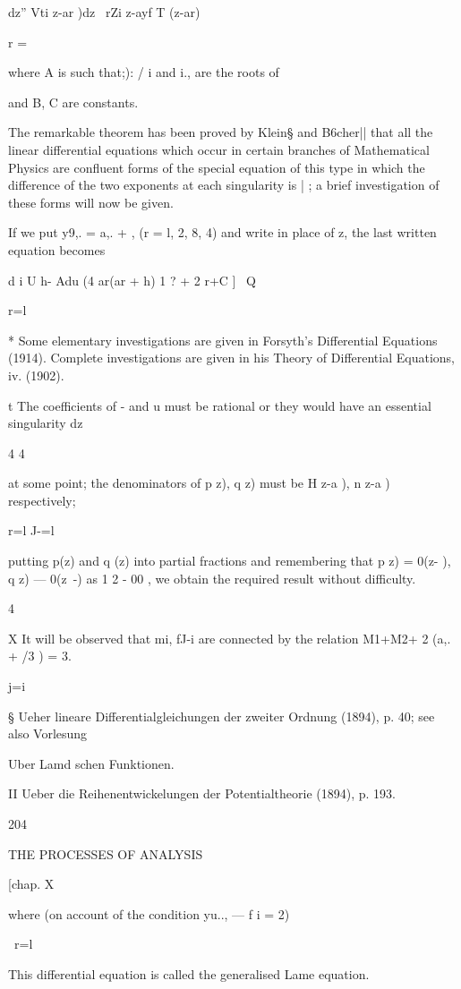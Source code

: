 dz'' Vti z-ar )dz \ rZi z-ayf T (z-ar)

r = \

where A is such that;): / i and i., are the roots of

and B, C are constants.

The remarkable theorem has been proved by Klein§ and B6cher|| that all
the linear differential equations which occur in certain branches of
Mathematical Physics are confluent forms of the special equation of
this type in which the difference of the two exponents at each
singularity is | ; a brief investigation of these forms will now be
given.

If we put y9,. = a,. + , (r = l, 2, 8, 4) and write in place of z, the
last written equation becomes

d i U h- Adu (4 ar(ar + h) 1 ? + 2 r+C ] \ Q

r=l

* Some elementary investigations are given in Forsyth's Differential
Equations (1914). Complete investigations are given in his Theory of
Differential Equations, iv. (1902).

t The coefficients of - and u must be rational or they would have an
essential singularity dz

4 4

at some point; the denominators of p z), q z) must be H z-a ), n z-a )
respectively;

r=l J-=l

putting p(z) and q (z) into partial fractions and remembering that p
z) = 0(z- ), q z) — 0(z~-) as 1 2 - 00 , we obtain the required result
without difficulty.

4

X It will be observed that mi, fJ-i are connected by the relation
M1+M2+ 2 (a,. + /3 ) = 3.

j=i

§ Ueher lineare Differentialgleichungen der zweiter Ordnung (1894), p.
40; see also Vorlesung

Uber Lamd schen Funktionen.

II Ueber die Reihenentwickelungen der Potentialtheorie (1894), p. 193.

204

THE PROCESSES OF ANALYSIS

[chap. X

where (on account of the condition yu.., — f i = 2)

\ r=l

This differential equation is called the generalised Lame equation.

